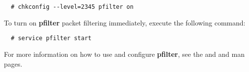 \begin{verbatim}
  # chkconfig --level=2345 pfilter on
\end{verbatim}

To turn on {\bf pfilter} packet filtering immediately, execute the
following command:

\begin{verbatim}
  # service pfilter start
\end{verbatim}

For more information on how to use and configure {\bf pfilter}, see
the  and  and
 man pages. 
